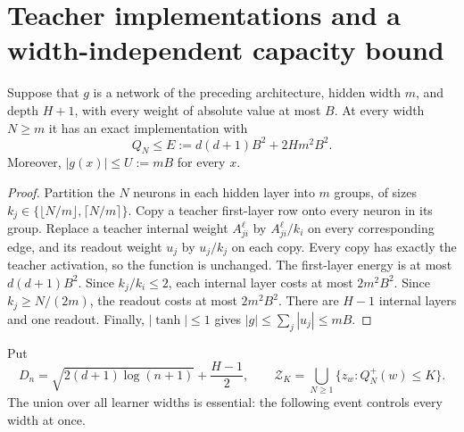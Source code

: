 \section{Teacher implementations and a width-independent capacity bound}

\begin{lemma}
\label{lem:gaussian-cloning}
Suppose that $g$ is a network of the preceding architecture, hidden
width $m$, and depth $H+1$, with every weight of absolute value at most
$B$.  At every width $N\geq m$ it has an exact implementation with
\begin{equation}
 Q_N\leq E:=d(d+1)B^2+2H m^2B^2.
 \label{eq:gaussian-teacher-energy}
\end{equation}
Moreover, $|g(x)|\leq U:=mB$ for every $x$.
\end{lemma}
\begin{proof}
Partition the $N$ neurons in each hidden layer into $m$ groups, of sizes
$k_j\in\{\lfloor N/m\rfloor,\lceil N/m\rceil\}$.  Copy a teacher
first-layer row onto every neuron in its group.  Replace a teacher
internal weight $A^\ell_{ji}$ by $A^\ell_{ji}/k_i$ on every corresponding
edge, and its readout weight $u_j$ by $u_j/k_j$ on each copy.  Every copy
has exactly the teacher activation, so the function is unchanged.
The first-layer energy is at most $d(d+1)B^2$.  Since $k_j/k_i\leq2$,
each internal layer costs at most $2m^2B^2$.  Since
$k_j\geq N/(2m)$, the readout costs at most $2m^2B^2$.  There are
$H-1$ internal layers and one readout.  Finally, $|\tanh|\leq1$ gives
$|g|\leq\sum_j|u_j|\leq mB$.
\end{proof}

Put
\begin{equation}
 D_n=\sqrt{2(d+1)\log(n+1)}+\frac{H-1}{2},\qquad
 \mathcal Z_K=\bigcup_{N\geq1}\{z_w:Q_N^+(w)\leq K\}.
 \label{eq:gaussian-Dn}
\end{equation}
The union over all learner widths is essential: the following event
controls every width at once.

